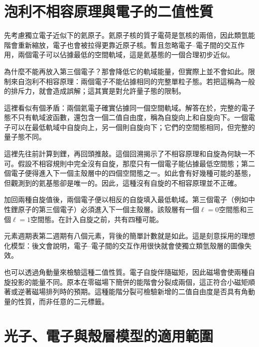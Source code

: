 \section{泡利不相容原理與電子的二值性質}

先考慮獨立電子近似下的氦原子。氦原子核的質子電荷是氫核的兩倍，因此類氫能階會重新縮放，電子也會被拉得更靠近原子核。暫且忽略電子--電子間的交互作用，兩個電子可以佔據最低的空間軌域，這是氦基態的一個合理初步近似。

為什麼不能再放入第三個電子？那會降低它的軌域能量，但實際上並不會如此。限制來自泡利不相容原理：兩個電子不能佔據相同的完整單粒子態。若把這稱為一般的排斥力，就會造成誤解；這其實是對允許量子態的限制。

這裡看似有個矛盾：兩個氦電子確實佔據同一個空間軌域。解答在於，完整的電子態不只有軌域波函數，還包含一個二值自由度，稱為自旋向上和自旋向下。一個電子可以在最低軌域中自旋向上，另一個則自旋向下；它們的空間態相同，但完整的量子態不同。

這裡先往前計算到鋰，再回頭推敲。這個回溯揭示了不相容原理和自旋為何缺一不可。假設不相容規則中完全沒有自旋，那麼只有一個電子能佔據最低空間態；第二個電子便得進入下一個主殼層中的四個空間態之一。如此會有好幾種可能的基態，但觀測到的氦基態卻是唯一的。因此，這種沒有自旋的不相容原理並不正確。

加回兩種自旋值後，兩個電子便以相反的自旋填入最低軌域。第三個電子（例如中性鋰原子的第三個電子）必須進入下一個主殼層。該殼層有一個\(\ell=0\)空間態和三個\(\ell=1\)空間態。在計入自旋之前，共有四種可能。

\begin{classroomqa}
\end{classroomqa}

元素週期表第二週期有八個元素，背後的簡單計數就是如此。這是刻意採用的理想化模型：後文會說明，電子--電子間的交互作用很快就會使獨立類氫殼層的圖像失效。

也可以透過角動量來檢驗這種二值性質。電子自旋伴隨磁矩，因此磁場會使兩種自旋投影的能量不同。原本在零磁場下簡併的能階會分裂成兩個，這正符合小磁矩順著或逆著磁場排列時的預期。這種能階分裂可檢驗新增的二值自由度是否具有角動量的性質，而非任意的二元標籤。

\section{光子、電子與殼層模型的適用範圍}

